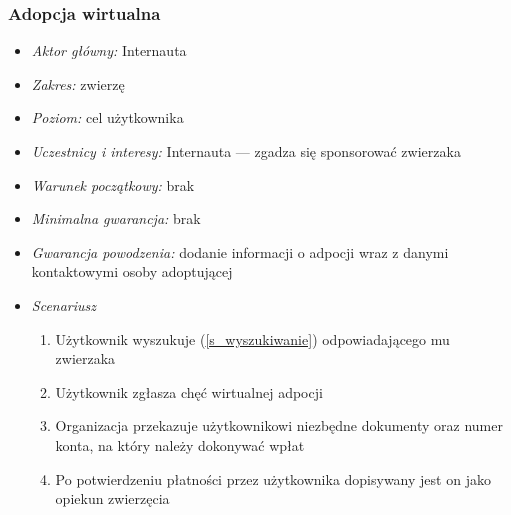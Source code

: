\documentclass[10pt,a4paper]{article}
\begin{document}
\subsubsection{Adopcja wirtualna}
\begin{itemize}
	\item \emph{Aktor główny:} Internauta
	\item \emph{Zakres:} zwierzę
	\item \emph{Poziom:} cel użytkownika
	\item \emph{Uczestnicy i interesy:} 
		Internauta --- zgadza się sponsorować zwierzaka
	\item \emph{Warunek początkowy:} brak
	\item \emph{Minimalna gwarancja:} brak
	\item \emph{Gwarancja powodzenia:} dodanie informacji o adpocji wraz z danymi kontaktowymi osoby adoptującej
	\item \emph{Scenariusz}
	\begin{enumerate}
		\item Użytkownik wyszukuje (\ref{s_wyszukiwanie}) odpowiadającego mu zwierzaka
		\item Użytkownik zgłasza chęć wirtualnej adpocji
		\item Organizacja przekazuje użytkownikowi niezbędne dokumenty oraz numer konta, na który należy dokonywać wpłat
		\item Po potwierdzeniu płatności przez użytkownika dopisywany jest on jako opiekun zwierzęcia
	\end{enumerate}
\end{itemize}
\end{document}

